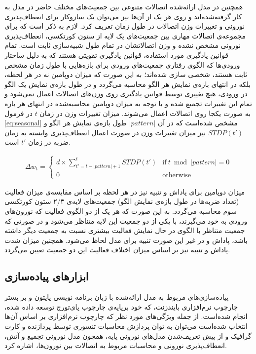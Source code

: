 \documentclass[12pt]{report}
\begin{document}
	همچنین در مدل ارائه‌شده اتصالات متنوعی بین جمعیت‌های مختلف حاضر در مدل به کار گرفته‌شده‌اند و روی هر یک از آن‌ها نیز می‌توان یک سازوکار برای انعطاف‌پذیری نورونی و تغییرات وزن اتصالات در طول زمان تعریف کرد. لازم به ذکر است که برای مجموعه‌ی اتصالات مهاری بین جمعیت‌های یک لایه از ستون کورتکسی، انعطاف‌پذیری نورونی مشخص نشده و وزن اتصالاتشان در تمام طول شبیه‌سازی ثابت است. تمام قوانین یادگیری مورد استفاده، قوانین یادگیری تقویتی هستند که به دلیل ساختار ورودی‌ها که الگوی رفتاری جمعیت‌های ورودی برای بازه‌هایی با طول زمان مشخص ثابت هستند، شخصی سازی شده‌اند؛ به این صورت که میزان دوپامین نه در هر لحظه، بلکه در انتهای بازه‌ی نمایش هر الگو محاسبه می‌گردد و در طول بازه‌ی نمایش یک الگو در ورودی، هیچ تغییری توسط قوانین یادگیری روی وزن‌های اتصالات اعمال نمی‌شود و تمام این تغییرات تجمیع شده و  با توجه به میزان دوپامین محاسبه‌شده در انتهای هر بازه به صورت یکجا روی اتصالات اعمال می‌شوند. میزان تغییرات وزن در زمان $t$ در فرمول \ref{eq:seasonal} مشخص شده‌است که در آن $|pattern|$ طول بازه‌ی نمایش هر الگو و $STDP(t')$ نیز میزان تغییرات وزن در صورت اعمال انعطاف‌پذیری وابسته به زمان ضربه در زمان $t'$ است.
	
	\begin{align}
		\Delta w_t =
		\begin{cases}
			d \times \sum_{t'=t-\left | pattern \right |+1}^{t} STDP(t') & \text{if}~t\bmod\left | pattern \right | = 0\\
			0 & \text{otherwise}
		\end{cases}  
		\label{eq:seasonal}
	\end{align}
	
	میزان دوپامین برای پاداش و تنبیه نیز در هر لحظه بر اساس مقایسه‌ی میزان فعالیت (تعداد ضربه‌ها در طول بازه‌ی نمایش الگو) جمعیت‌های لایه‌ی ۲/۳ ستون کورتکسی سوم محاسبه می‌گردد. به این صورت که هر یک از دو الگوی فعالیت که نورون‌های ورودی به خود می‌گیرند، با یکی از دو جمعیت این لایه متناظر می‌شود و در صورتی که جمعیت متناظر با الگوی در حال نمایش فعالیت بیشتری نسبت به جمعیت دیگر داشته باشد، پاداش و در غیر این صورت تنبیه برای مدل لحاظ می‌شود. همچنین میزان شدت پاداش و تنبیه نیز بر اساس میزان اختلاف فعالیت این دو جمعیت تعیین می‌گردد.
	
	

	\subsection{ابزار‌های پیاده‌سازی}
	
	پیاده‌سازی‌های مربوط به مدل ارائه‌شده با زبان برنامه نویسی پایتون و بر بستر چارچوب نرم‌افزاری بایندزنت، که خود برپایه‌ی چارچوب پای‌تورچ توسعه داده شده‌، انجام شده‌است. از جمله ویژگی‌های مورد نظر که چارچوب نرم‌افزاری بر اساس آن‌ها انتخاب شده‌است می‌توان به توان پردازش محاسبات تنسوری توسط پردازنده و کارت گرافیک و از پیش تعریف‌شدن مدل‌های نورونی پایه، همچون مدل نورونی تجمیع و آتش، انعطاف‌پذیری نورونی و محاسبات مربوط به اتصالات بین نورون‌ها، اشاره کرد.
	
\end{document}
